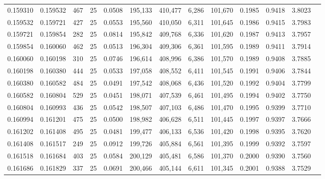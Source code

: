 \begin{tabular}{rrrrrrrrrrrrr}
0.159310 & 0.159532 &   467 &  25 &                                     0.0508 & 195,133 & 410,477 &   6,286 & 101,670 & 0.1985 & 0.9418 & 3.8023 \\
0.159532 & 0.159721 &   427 &  25 &                                     0.0553 & 195,560 & 410,050 &   6,311 & 101,645 & 0.1986 & 0.9415 & 3.7983 \\
0.159721 & 0.159854 &   282 &  25 &                                     0.0814 & 195,842 & 409,768 &   6,336 & 101,620 & 0.1987 & 0.9413 & 3.7957 \\
0.159854 & 0.160060 &   462 &  25 &                                     0.0513 & 196,304 & 409,306 &   6,361 & 101,595 & 0.1989 & 0.9411 & 3.7914 \\
0.160060 & 0.160198 &   310 &  25 &                                     0.0746 & 196,614 & 408,996 &   6,386 & 101,570 & 0.1989 & 0.9408 & 3.7885 \\
0.160198 & 0.160380 &   444 &  25 &                                     0.0533 & 197,058 & 408,552 &   6,411 & 101,545 & 0.1991 & 0.9406 & 3.7844 \\
0.160380 & 0.160582 &   484 &  25 &                                     0.0491 & 197,542 & 408,068 &   6,436 & 101,520 & 0.1992 & 0.9404 & 3.7799 \\
0.160582 & 0.160804 &   529 &  25 &                                     0.0451 & 198,071 & 407,539 &   6,461 & 101,495 & 0.1994 & 0.9402 & 3.7750 \\
0.160804 & 0.160993 &   436 &  25 &                                     0.0542 & 198,507 & 407,103 &   6,486 & 101,470 & 0.1995 & 0.9399 & 3.7710 \\
0.160994 & 0.161201 &   475 &  25 &                                     0.0500 & 198,982 & 406,628 &   6,511 & 101,445 & 0.1997 & 0.9397 & 3.7666 \\
0.161202 & 0.161408 &   495 &  25 &                                     0.0481 & 199,477 & 406,133 &   6,536 & 101,420 & 0.1998 & 0.9395 & 3.7620 \\
0.161408 & 0.161517 &   249 &  25 &                                     0.0912 & 199,726 & 405,884 &   6,561 & 101,395 & 0.1999 & 0.9392 & 3.7597 \\
0.161518 & 0.161684 &   403 &  25 &                                     0.0584 & 200,129 & 405,481 &   6,586 & 101,370 & 0.2000 & 0.9390 & 3.7560 \\
0.161686 & 0.161829 &   337 &  25 &                                     0.0691 & 200,466 & 405,144 &   6,611 & 101,345 & 0.2001 & 0.9388 & 3.7529 \\

\end{tabular}
